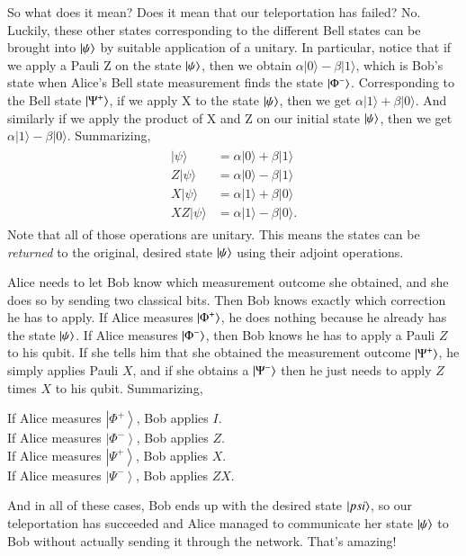 So what does it mean? Does it mean that our teleportation has failed? No. Luckily, these other states corresponding to the different Bell states can be brought into $\left| \psi \right\rangle$ by suitable application of a unitary. In particular, notice that if we apply a Pauli Z on the state $\left| \psi \right\rangle$, then we obtain $\alpha|0\rangle-\beta|1\rangle$, which is Bob's state when Alice's Bell state measurement finds the state $\left| \Phi^- \right\rangle$. Corresponding to the Bell state $\left| \Psi^+ \right\rangle$, if we apply X to the state $\left| \psi \right\rangle$, then we get $\alpha|1\rangle+\beta|0\rangle$. And similarly if we apply the product of X and Z on our initial state $\left| \psi \right\rangle$, then we get $\alpha|1\rangle-\beta|0\rangle$. Summarizing,
\begin{align}
\begin{aligned}
|\psi\rangle &=\alpha|0\rangle+\beta|1\rangle \\
Z|\psi\rangle &=\alpha|0\rangle-\beta|1\rangle \\
X|\psi\rangle &=\alpha|1\rangle+\beta|0\rangle \\
X Z|\psi\rangle &=\alpha|1\rangle-\beta|0\rangle.
\end{aligned}
\end{align}
Note that all of those operations are unitary.  This means the states can be \emph{returned} to the original, desired state $\left| \psi \right\rangle$ using their adjoint operations.

Alice needs to let Bob know which measurement outcome she obtained, and she does so by sending two classical bits. Then Bob knows exactly which correction he has to apply. If Alice measures $\left| \Phi^+ \right\rangle$, he does nothing because he already has the state $\left| \psi \right\rangle$. If Alice measures $\left| \Phi^- \right\rangle$, then Bob knows he has to apply a Pauli $Z$ to his qubit. If she tells him that she obtained the measurement outcome $\left| \Psi^+ \right\rangle$, he simply applies Pauli $X$, and if she obtains a $\left| \Psi^- \right\rangle$ then he just needs to apply $Z$ times $X$ to his qubit.  Summarizing,

\noindent
If Alice measures $\left|\Phi^{+}\right\rangle$, Bob applies $I$.\\
If Alice measures $\left|\Phi^{-}\right\rangle$, Bob applies $Z$.\\
If Alice measures $\left|\Psi^{+}\right\rangle$, Bob applies $X$.\\
If Alice measures $\left|\Psi^{-}\right\rangle$, Bob applies $Z X$.

And in all of these cases, Bob ends up with the desired state $\left| psi \right\rangle$, so our teleportation has succeeded and Alice managed to communicate her state $\left| \psi \right\rangle$ to Bob without actually sending it through the network. That's amazing!

